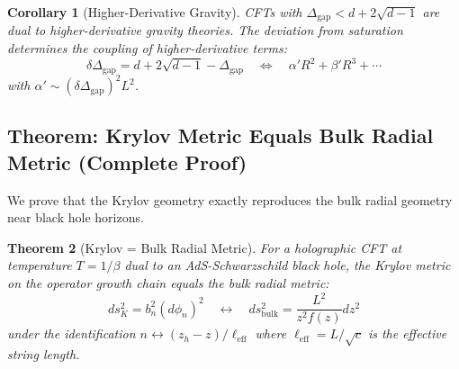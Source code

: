 \documentclass[12pt,a4paper]{article}
\newtheorem{theorem}{Theorem}[section]
\newtheorem{corollary}[theorem]{Corollary}
\begin{document}
\begin{corollary}[Higher-Derivative Gravity]
CFTs with $\Delta_{\text{gap}} < d + 2\sqrt{d-1}$ are dual to higher-derivative gravity theories. The deviation from saturation determines the coupling of higher-derivative terms:
\begin{equation}
\delta\Delta_{\text{gap}} = d + 2\sqrt{d-1} - \Delta_{\text{gap}} \quad \Leftrightarrow \quad \alpha' R^2 + \beta' R^3 + \cdots
\end{equation}
with $\alpha' \sim (\delta\Delta_{\text{gap}})^2 L^2$.
\end{corollary}

\subsection{Theorem: Krylov Metric Equals Bulk Radial Metric (Complete Proof)}

We prove that the Krylov geometry exactly reproduces the bulk radial geometry near black hole horizons.

\begin{theorem}[Krylov = Bulk Radial Metric]\label{thm:krylov-bulk}
For a holographic CFT at temperature $T = 1/\beta$ dual to an AdS-Schwarzschild black hole, the Krylov metric on the operator growth chain equals the bulk radial metric:
\begin{equation}
ds^2_K = b_n^2 (d\phi_n)^2 \quad \longleftrightarrow \quad ds^2_{\text{bulk}} = \frac{L^2}{z^2 f(z)} dz^2
\end{equation}
under the identification $n \leftrightarrow (z_h - z)/\ell_{\text{eff}}$ where $\ell_{\text{eff}} = L/\sqrt{c}$ is the effective string length.
\end{theorem}
\end{document}

